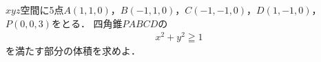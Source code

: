\documentclass[../../main.tex]{subfiles}
\begin{document}
$xyz$空間に5点$A(1,1,0)$，$B(-1,1,0)$，$C(-1,-1,0)$，$D(1,-1,0)$，$P(0,0,3)$をとる．
四角錐$PABCD$の
\begin{align*}
  x^2+y^2\geqq1
\end{align*}
を満たす部分の体積を求めよ．
\end{document}
